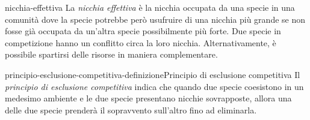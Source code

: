 \documentclass[preview]{standalone}
\begin{document}
\begin{snippet}{nicchia-effettiva}
    La \textit{nicchia effettiva} è la nicchia occupata da una specie in una comunità
    dove la specie potrebbe però usufruire di una nicchia più grande se
    non fosse già occupata da un'altra specie possibilmente più forte.
    Due specie in competizione hanno un conflitto circa la loro nicchia.
    Alternativamente, è possibile spartirsi delle risorse in maniera complementare.
\end{snippet}

\begin{snippetdefinition}{principio-esclusione-competitiva-definizione}{Principio di esclusione competitiva}
    Il \textit{principio di esclusione competitiva} indica che quando due specie coesistono in un medesimo ambiente e le due specie
    presentano nicchie sovrapposte, allora una delle due specie prenderà il sopravvento sull'altro
    fino ad eliminarla.
\end{snippetdefinition}

\end{document}

